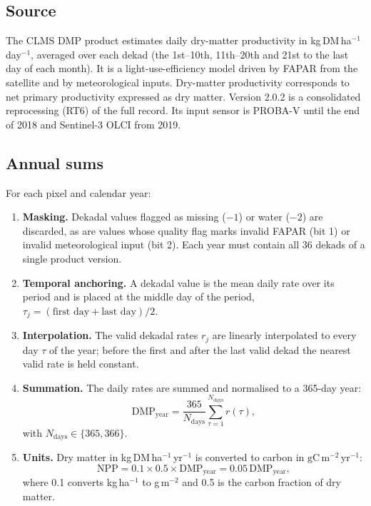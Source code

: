 \documentclass[11pt,a4paper]{article}
\newcommand{\npp}{\ensuremath{\mathrm{gC\,m^{-2}\,yr^{-1}}}}
\begin{document}
\subsection{Source}

The CLMS DMP product estimates daily dry-matter productivity in kg\,DM\,ha$^{-1}$\,day$^{-1}$,
averaged over each dekad (the 1st--10th, 11th--20th and 21st to the last day of each month).
It is a light-use-efficiency model driven by FAPAR from the satellite and by meteorological
inputs. Dry-matter productivity corresponds to net primary productivity expressed as dry
matter. Version 2.0.2 is a consolidated reprocessing (RT6) of the full record. Its input
sensor is PROBA-V until the end of 2018 and Sentinel-3 OLCI from 2019.

\subsection{Annual sums}

For each pixel and calendar year:

\begin{enumerate}
\item \textbf{Masking.} Dekadal values flagged as missing ($-1$) or water ($-2$) are
discarded, as are values whose quality flag marks invalid FAPAR (bit 1) or invalid
meteorological input (bit 2). Each year must contain all 36 dekads of a single product
version.
\item \textbf{Temporal anchoring.} A dekadal value is the mean daily rate over its period and is
placed at the middle day of the period, $\tau_j = (\text{first day} + \text{last day})/2$.
\item \textbf{Interpolation.} The valid dekadal rates $r_j$ are linearly interpolated to every
day $\tau$ of the year; before the first and after the last valid dekad the nearest valid rate is
held constant.
\item \textbf{Summation.} The daily rates are summed and normalised to a 365-day year:
\begin{equation}
\mathrm{DMP}_{\text{year}} = \frac{365}{N_{\text{days}}} \sum_{\tau=1}^{N_{\text{days}}} r(\tau),
\end{equation}
with $N_{\text{days}} \in \{365, 366\}$.
\item \textbf{Units.} Dry matter in kg\,DM\,ha$^{-1}$\,yr$^{-1}$ is converted to carbon in
\npp:
\begin{equation}
\mathrm{NPP} = 0.1 \times 0.5 \times \mathrm{DMP}_{\text{year}} = 0.05\,\mathrm{DMP}_{\text{year}},
\end{equation}
where 0.1 converts kg\,ha$^{-1}$ to g\,m$^{-2}$ and 0.5 is the carbon fraction of dry matter.
\end{enumerate}
\end{document}
